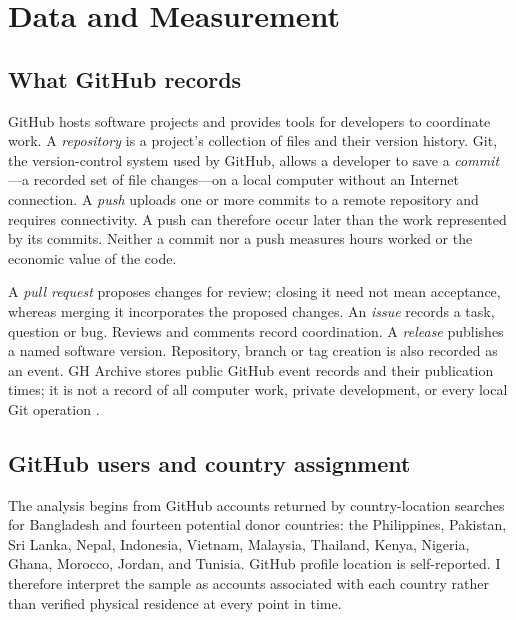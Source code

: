 \section{Data and Measurement}
\label{sec:data}

\subsection{What GitHub records}

GitHub hosts software projects and provides tools for developers to coordinate work. A \emph{repository} is a project's collection of files and their version history. Git, the version-control system used by GitHub, allows a developer to save a \emph{commit}---a recorded set of file changes---on a local computer without an Internet connection. A \emph{push} uploads one or more commits to a remote repository and requires connectivity. A push can therefore occur later than the work represented by its commits. Neither a commit nor a push measures hours worked or the economic value of the code.

A \emph{pull request} proposes changes for review; closing it need not mean acceptance, whereas merging it incorporates the proposed changes. An \emph{issue} records a task, question or bug. Reviews and comments record coordination. A \emph{release} publishes a named software version. Repository, branch or tag creation is also recorded as an event. GH Archive stores public GitHub event records and their publication times; it is not a record of all computer work, private development, or every local Git operation \citep{gharchive,githubevents}.

\subsection{GitHub users and country assignment}
\label{sec:users}

The analysis begins from GitHub accounts returned by country-location searches for Bangladesh and fourteen potential donor countries: the Philippines, Pakistan, Sri Lanka, Nepal, Indonesia, Vietnam, Malaysia, Thailand, Kenya, Nigeria, Ghana, Morocco, Jordan, and Tunisia. GitHub profile location is self-reported. I therefore interpret the sample as accounts associated with each country rather than verified physical residence at every point in time.

